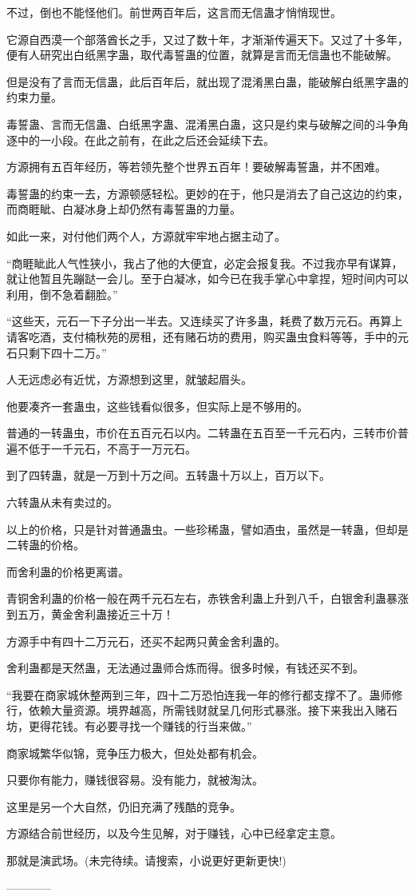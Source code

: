 \begin{this_body}
不过，倒也不能怪他们。前世两百年后，这言而无信蛊才悄悄现世。

它源自西漠一个部落酋长之手，又过了数十年，才渐渐传遍天下。又过了十多年，便有人研究出白纸黑字蛊，取代毒誓蛊的位置，就算是言而无信蛊也不能破解。

但是没有了言而无信蛊，此后百年后，就出现了混淆黑白蛊，能破解白纸黑字蛊的约束力量。

毒誓蛊、言而无信蛊、白纸黑字蛊、混淆黑白蛊，这只是约束与破解之间的斗争角逐中的一小段。在此之前有，在此之后还会延续下去。

方源拥有五百年经历，等若领先整个世界五百年！要破解毒誓蛊，并不困难。

毒誓蛊的约束一去，方源顿感轻松。更妙的在于，他只是消去了自己这边的约束，而商睚眦、白凝冰身上却仍然有毒誓蛊的力量。

如此一来，对付他们两个人，方源就牢牢地占据主动了。

“商睚眦此人气性狭小，我占了他的大便宜，必定会报复我。不过我亦早有谋算，就让他暂且先蹦跶一会儿。至于白凝冰，如今已在我手掌心中拿捏，短时间内可以利用，倒不急着翻脸。”

“这些天，元石一下子分出一半去。又连续买了许多蛊，耗费了数万元石。再算上请客吃酒，支付楠秋苑的房租，还有赌石坊的费用，购买蛊虫食料等等，手中的元石只剩下四十二万。”

人无远虑必有近忧，方源想到这里，就皱起眉头。

他要凑齐一套蛊虫，这些钱看似很多，但实际上是不够用的。

普通的一转蛊虫，市价在五百元石以内。二转蛊在五百至一千元石内，三转市价普遍不低于一千元石，不高于一万元石。

到了四转蛊，就是一万到十万之间。五转蛊十万以上，百万以下。

六转蛊从未有卖过的。

以上的价格，只是针对普通蛊虫。一些珍稀蛊，譬如酒虫，虽然是一转蛊，但却是二转蛊的价格。

而舍利蛊的价格更离谱。

青铜舍利蛊的价格一般在两千元石左右，赤铁舍利蛊上升到八千，白银舍利蛊暴涨到五万，黄金舍利蛊接近三十万！

方源手中有四十二万元石，还买不起两只黄金舍利蛊的。

舍利蛊都是天然蛊，无法通过蛊师合炼而得。很多时候，有钱还买不到。

“我要在商家城休整两到三年，四十二万恐怕连我一年的修行都支撑不了。蛊师修行，依赖大量资源。境界越高，所需钱财就呈几何形式暴涨。接下来我出入赌石坊，更得花钱。有必要寻找一个赚钱的行当来做。”

商家城繁华似锦，竞争压力极大，但处处都有机会。

只要你有能力，赚钱很容易。没有能力，就被淘汰。

这里是另一个大自然，仍旧充满了残酷的竞争。

方源结合前世经历，以及今生见解，对于赚钱，心中已经拿定主意。

那就是演武场。(未完待续。请搜索，小说更好更新更快!)

------------

\end{this_body}


